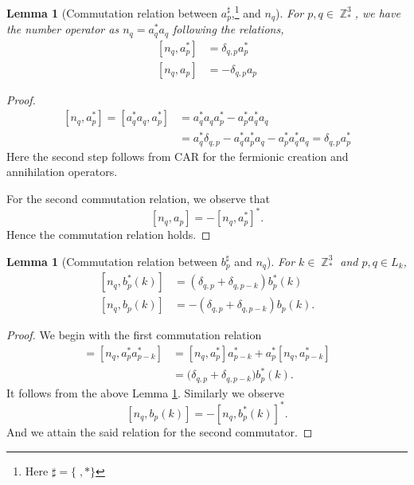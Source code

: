 \documentclass[sn-mathphys, Numbered ,a4paper]{sn-jnl}%
\DeclareMathOperator{\Z}{\mathbb{Z}}
\newcommand{\com}[1]{\left[ #1 \right]}
\theoremstyle{plain}
\newtheorem{lemma}[theorem]{Lemma}
\theoremstyle{definition}
\theoremstyle{remark}
\theoremstyle{plain}
\theoremstyle{definition}
\theoremstyle{remark}
\begin{document}
\begin{lemma}[Commutation relation between $a^\sharp_p$,\footnote{Here 
$\sharp = \{\;,*\} $} and $n_q$]\label{lem:coman}
For $p,q \in \Z^3_*$, we have the number operator as $n_q=a^*_q a_q$ following the relations,
    \begin{align}
        \com{n_q,a^*_p} &= \delta_{q,p}a^*_p\\
        \com{n_q,a_p} &= -\delta_{q,p}a_p
    \end{align}
\end{lemma} 
\begin{proof}
    \begin{align}
        \com{n_q,a^*_p} = \com{a^*_qa_q,a^*_p}&=a^*_qa_qa^*_p - a^*_pa^*_qa_q\nonumber\\
        &= a^*_q\delta_{q,p}- a^*_q a^*_p a_q - a^*_p a^*_q a_q =\delta_{q,p}a^*_p
    \end{align}
    Here the second step follows from CAR for the fermionic creation and annihilation operators.
    
For the second commutation relation, we observe that 
    \begin{equation}
        \com{n_q,a_p}= -\com{n_q,a^*_p}^*.
    \end{equation}
Hence the commutation relation holds.
\end{proof}
\begin{lemma}[Commutation relation between $b^\sharp_p$ and $n_q$]
  For $k \in \Z^3_*$ and $p,q \in L_{k}$,
    \begin{align}
        \com{n_q,b^*_p(k)} &= \left(\delta_{q,p}+\delta_{q,p-k}\right)b^*_p(k)\\
        \com{n_q,b_p(k)} &= -\left(\delta_{q,p}+\delta_{q,p-k}\right)b_p(k).
    \end{align}
\end{lemma} 
\begin{proof} We begin with the first commutation relation
    \begin{align}
        [n_q, b^*_p(k)] = [n_q, a^*_p a^*_{p-k}] &= [n_q, a^*_p] a^*_{p-k} + a^*_p [n_q, a^*_{p-k} ]\nonumber\\
        &=\big( \delta_{q,p} +\delta_{q,p-k} \big) b^*_p(k).
    \end{align}
    It follows from the above Lemma \ref{lem:coman}. Similarly we observe
    \begin{equation}
         \com{n_q,b_p(k)}= -\com{n_q,b^*_p(k)}^*.
    \end{equation}
    And we attain the said relation for the second commutator.
\end{proof}
\end{document}

